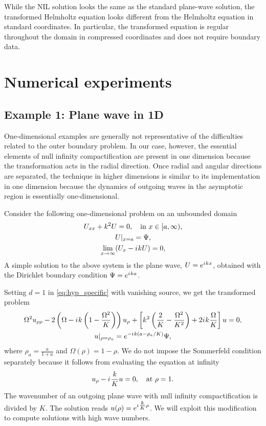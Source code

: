 \documentclass[draft,onefignum,onetabnum]{siamart190516}
\newcommand{\iu}{{i\mkern1mu}}
\begin{document}
While the NIL solution looks the same as the standard plane-wave solution, the transformed Helmholtz equation looks different from the Helmholtz equation in standard coordinates. In particular, the transformed equation is regular throughout the domain in compressed coordinates and does not require boundary data. 

\section{Numerical experiments}\label{sec:numerical}
\subsection{Example 1: Plane wave in 1D}\label{sec:oned}
One-dimensional examples are generally not representative of the difficulties related to the outer boundary problem. In our case, however, the essential elements of null infinity compactification are present in one dimension because the transformation acts in the radial direction. Once radial and angular directions are separated, the technique in higher dimensions is similar to its implementation in one dimension because the dynamics of outgoing waves in the asymptotic region is essentially one-dimensional.

Consider the following one-dimensional problem on an unbounded domain
\begin{equation}
	\label{eq:oneD}
	\begin{gathered}
		U_{xx} + k^2 U = 0, \quad \mathrm{in} \ x\in[a,\infty),\\
		U|_{x=a} = \Psi,\\
		\lim_{x\to\infty} (U_x - \iu k U) = 0,
	\end{gathered}
\end{equation}
A simple solution to the above system is the plane wave, $U=e^{\iu k x}$, obtained with the Dirichlet boundary condition $\Psi=e^{\iu k a}$. 

Setting $d=1$ in \eqref{eq:hyp_specific} with vanishing source, we get the transformed problem
\begin{equation}
	\label{eq:hyp_1d}
	\begin{gathered}
		\Omega^2 u_{\rho\rho} - 2 \left(\Omega-\iu k \left(1-\frac{\Omega^2}{K}\right) \right) u_\rho + \left[k^2 \left(\frac{2}{K}-\frac{\Omega^2}{K^2}\right) + 2 \iu k \frac{\Omega}{K} \right] u = 0,\\
		u|_{\rho=\rho_a} = e^{-\iu k (a-\rho_a/K)}\Psi,
	\end{gathered}
\end{equation}
where $\rho_a=\tfrac{a}{1+a}$ and $\Omega(\rho)=1-\rho$. We do not impose the Sommerfeld condition separately because it follows from evaluating the equation at infinity 
\[ u_\rho - \iu \frac{k}{K} u = 0,   \quad \mathrm{at} \ \rho=1. \]
The wavenumber of an outgoing plane wave with null infinity compactification is divided by $K$. The solution reads $u(\rho)=e^{\iu \tfrac{k}{K} \rho}$. We will exploit this modification to compute solutions with high wave numbers.
\end{document}
